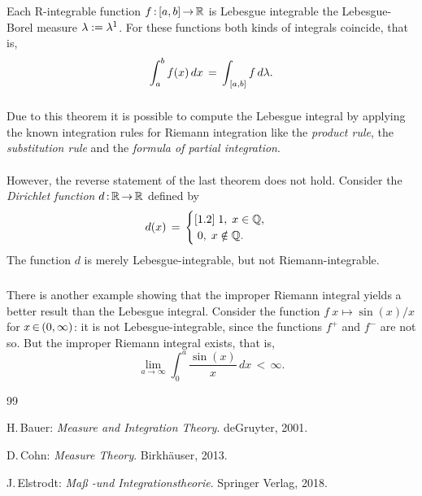 \documentclass[11pt,twoside]{article}
\begin{document}
\begin{theorem}
Each R-integrable function $f{\,:\,}[a,b] {\,\to\,} {\mathbb{R}}$
is Lebesgue integrable {\wrt} the Lebesgue-Borel measure $\lambda := \lambda^1$.
For these functions both kinds of integrals coincide,
that is,
\[
\int_a^b f(x) \, dx \,=\, \int_{\,[a,b]} f \, d\lambda.
\]
\end{theorem}

\subparagraph{}
Due to this theorem
it is possible to compute the Lebesgue integral by applying
the known integration rules for Riemann integration like
the \textit{product rule},
the \textit{substitution rule} and
the \textit{formula of partial integration}.

\paragraph{}
However,
the reverse statement of the last theorem does not hold.
Consider the \textit{Dirichlet function} $d {\,:\,} {\mathbb{R}} {\,\to\,} {\mathbb{R}}$ defined by
\[
d(x) \,=\,
\begin{cases}[1.2]
\; 1, \; x \in    {\mathbb{Q}}, \\
\; 0, \; x \notin {\mathbb{Q}}. \\
\end{cases}
\]
The function $d$ is merely Lebesgue-integrable,
but not Riemann-integrable.

\subparagraph{}
There is another example showing that
the improper Riemann integral yields a better result than the Lebesgue integral.
Consider the function $f \: x \mapsto \sin(x)/x$ for $x {\,\in\,} (0,\infty)$:
it is not Lebesgue-integrable,
since the functions $f^+$ and $f^-$ are not so.
But the improper Riemann integral exists,
that is,
\[
\lim_{a \to \infty} \int_0^{a} \frac{\sin(x)}{x} \, dx \, < \, \infty.
\]

\vspace{8mm}
\begin{thebibliography}{99}
\begin{small}

 H.\,Bauer:
\textit{Measure and Integration Theory}.
deGruyter, 2001.

 D.\,Cohn:
\textit{Measure Theory}.
Birkhäuser, 2013.

 J.\,Elstrodt:
\textit{Ma{\ss} -und Integrationstheorie}.
Springer Verlag, 2018.

\end{small}
\end{thebibliography}

\end{document}

